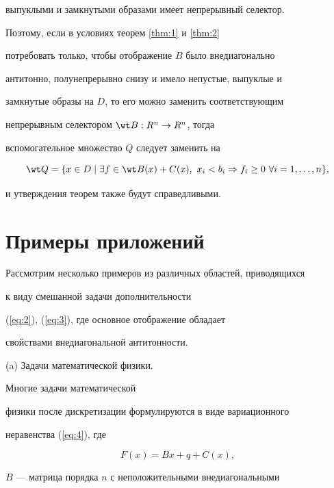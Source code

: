 выпуклыми и замкнутыми образами имеет непрерывный селектор.


Поэтому, если в условиях теорем \ref{thm:1} и \ref{thm:2}


потребовать только, чтобы отображение $B$ было внедиагонально


антитонно, полунепрерывно снизу и имело непустые, выпуклые и


замкнутые образы на $D$, то его можно заменить соответствующим


непрерывным селектором $\wt B: R^n \to R^n$, тогда


вспомогательное множество $Q$ следует заменить на


$$


\wt Q=\{ x \in D \mid \exists f \in \wt B(x)+ C(x),


\ x_i<b_i \Rightarrow f_i \ge 0 \ \forall i = 1,\dotsc,n\},


$$


и утверждения теорем также будут справедливыми.








\section{Примеры приложений}





Рассмотрим несколько примеров из различных областей, приводящихся


к виду смешанной задачи дополнительности


(\ref{eq:2}), (\ref{eq:3}), где основное отображение обладает


свойствами внедиагональной антитонности.


\medskip





(a) Задачи математической физики.





Многие задачи математической


физики после дискретизации формулируются в виде вариационного


неравенства (\ref{eq:4}), где


$$


F (x) = B x + q + C(x),


$$


$B$ --- матрица порядка $n$ с неположительными внедиагональными


